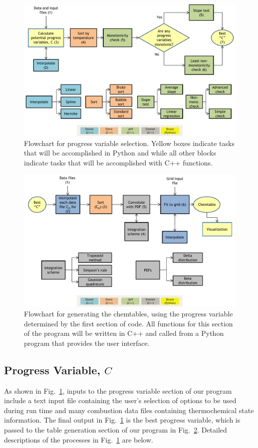 \documentclass[11pt]{article}
\begin{document}
\begin{figure} [h]
\centering
\includegraphics[width=\textwidth]{diagram_1_shortened_v4}
\caption{\label{fig:flow1} Flowchart for progress variable selection. Yellow boxes indicate tasks that will be accomplished in Python and while all other blocks indicate tasks that will be accomplished with C++ functions.}
\end{figure}

\begin{figure} [h]
\centering
\includegraphics[width=\textwidth]{diagram_2_shortened_v4}
\caption{\label{fig:flow2} Flowchart for generating the chemtables, using the progress variable  determined by the first section of code. All functions for this section of the program will be written in C++ and called from a Python program that provides the user interface.}
\end{figure}

\subsection{Progress Variable, $C$}
As shown in Fig.~\ref{fig:flow1}, inputs to the progress variable
section of our program include a text input file containing the user’s
selection of options to be used during run time and many combustion
data files containing thermochemical state information. The final
output in Fig.~\ref{fig:flow1} is the best progress variable, which is
passed to the table generation section of our program in
Fig.~\ref{fig:flow2}. Detailed descriptions of the processes in
Fig.~\ref{fig:flow1} are below.
\end{document}
